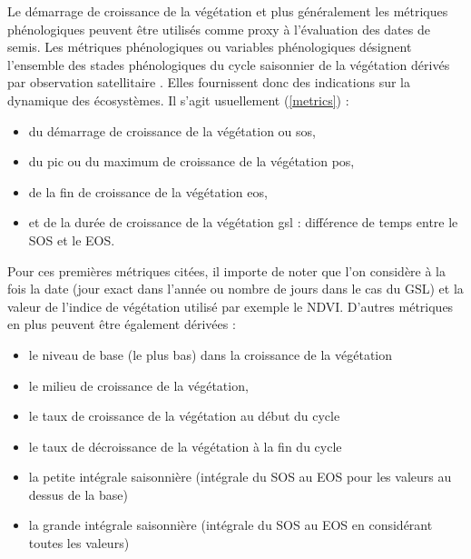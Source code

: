 Le démarrage de croissance de la végétation et plus généralement les métriques phénologiques peuvent être utilisés comme proxy à l'évaluation des dates de semis. Les métriques phénologiques
ou variables phénologiques désignent l'ensemble des stades phénologiques du cycle saisonnier de la végétation dérivés par observation satellitaire \citep{Helman2018}. Elles fournissent 
donc des indications sur la dynamique des écosystèmes.
Il s'agit usuellement (\cref{metrics}) : 
\begin{itemize}
 \item du démarrage de croissance de la végétation ou \acrshort{sos},
 \item du pic ou du maximum de croissance de la végétation \acrshort{pos},
 \item de la fin de croissance de la végétation \acrshort{eos},
 \item et de la durée de croissance de la végétation \acrshort{gsl} : différence de temps entre le SOS et le EOS.
\end{itemize}
Pour ces premières métriques citées, il importe de noter que l'on considère à la fois la date (jour exact dans l'année ou nombre de jours dans le cas du GSL) et la valeur de l'indice de 
végétation utilisé par exemple le NDVI. D'autres métriques en plus peuvent être également dérivées : 
\begin{itemize}
 \item le niveau de base (le plus bas) dans la croissance de la végétation
 \item le milieu de croissance de la végétation,
 \item le taux de croissance de la végétation au début du cycle
 \item le taux de décroissance de la végétation à la fin du cycle
 \item la petite intégrale saisonnière (intégrale du SOS au EOS pour les valeurs au dessus de la base)
 \item la grande intégrale saisonnière (intégrale du SOS au EOS en considérant toutes les valeurs)
\end{itemize}


